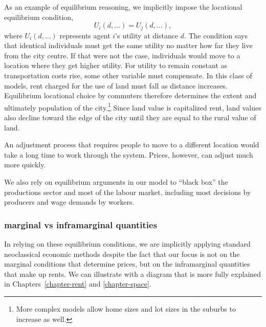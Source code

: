 As an example of \gls{equilibrium reasoning},  we implicitly impose the locational equilibrium condition,
\[U_i(d,\dots)=U_j(d, \dots),\]where $U_i(d,\dots)$ represents agent $i$'s utility at distance $d$. 
The condition says that identical individuals must get the same utility no matter how far they live from the city centre. If that were not the case, individuals would move to a location where they get higher utility. For utility to remain constant as  transportation costs  rise, some other variable must compensate. In this class of models, rent charged for the use of land must fall as distance increases. Equilibrium locational choice by commuters therefore determines the extent and ultimately  population of the city.\footnote{More complex models allow home sizes and lot sizes in the suburbs to increase as well.} Since land value  is \gls{capitalize}d rent, land values also decline toward the edge of the city until they are equal to the rural value of land. 

An adjustment process that requires people to move to a different location would take a long time to work through the system. Prices, however, can adjust much more quickly.




We also rely on equilibrium arguments in our model to ``black box'' the productions sector and most of  the labour market, including most decisions by producers and wage demands by workers. 


\subsubsection{\Gls{marginal} vs \gls{inframarginal} quantities}
In relying on these equilibrium conditions, we are implicitly applying standard neoclassical economic methods despite the fact that our focus is not on the \gls{marginal} conditions that determine prices, but on the \gls{inframarginal} quantities that make up rents. We can illustrate with a diagram that is more fully explained in Chapters~\ref{chapter-rent} and \ref{chapter-space}. 

